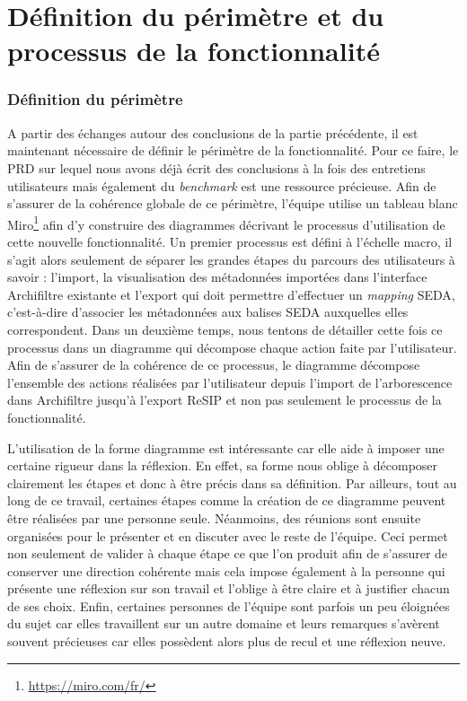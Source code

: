 \chapter{Définition du périmètre et du processus de la fonctionnalité}
\subsection{Définition du périmètre}
A partir des échanges autour des conclusions de la partie précédente, il est maintenant nécessaire de définir le périmètre de la fonctionnalité.  Pour ce faire, le \gls{PRD} sur lequel nous avons déjà écrit des conclusions à la fois des entretiens utilisateurs mais également du \textit{\gls{benchmark}} est une ressource précieuse. Afin de s’assurer de la cohérence globale de ce périmètre, l’équipe utilise un tableau blanc Miro\footnote{ \href{https://miro.com/fr/}{https://miro.com/fr/}} afin d’y construire des diagrammes décrivant le processus d’utilisation de cette nouvelle fonctionnalité. Un premier processus est défini à l’échelle macro, il s’agit alors seulement de séparer les grandes étapes du parcours des utilisateurs à savoir : l’import, la visualisation des métadonnées importées dans l’interface \gls{Archifiltre} existante et l’export qui doit permettre d’effectuer un \textit{\gls{mapping}} \gls{SEDA}, c’est-à-dire d’associer les métadonnées aux balises \gls{SEDA} auxquelles elles correspondent. Dans un deuxième temps, nous tentons de détailler cette fois ce processus dans un diagramme qui décompose chaque action faite par l’utilisateur. Afin de s’assurer de la cohérence de ce processus, le diagramme décompose l’ensemble des actions réalisées par l’utilisateur depuis l’import de l’arborescence dans \gls{Archifiltre} jusqu’à l’export ReSIP et non pas seulement le processus de la fonctionnalité. 

\clearpage



L’utilisation de la forme diagramme est intéressante car elle aide à imposer une certaine rigueur dans la réflexion. En effet, sa forme nous oblige à décomposer clairement les étapes et donc à être précis dans sa définition. Par ailleurs, tout au long de ce travail, certaines étapes comme la création de ce diagramme peuvent être réalisées par une personne seule. Néanmoins, des réunions sont ensuite organisées pour le présenter et en discuter avec le reste de l’équipe. Ceci permet non seulement de valider à chaque étape ce que l’on produit afin de s’assurer de conserver une direction cohérente mais cela impose également à la personne qui présente une réflexion sur son travail et l’oblige à être claire et à justifier chacun de ses choix. Enfin, certaines personnes de l’équipe sont parfois un peu éloignées du sujet car elles travaillent sur un autre domaine et leurs remarques s’avèrent souvent précieuses car elles possèdent alors plus de recul et une réflexion neuve. 

